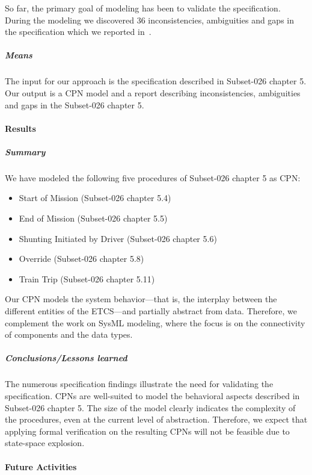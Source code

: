 So far, the primary goal of modeling has been to validate the specification. During the modeling we discovered 36 inconsistencies, ambiguities and gaps in the specification which we reported in~\cite{specfindings}. 


\subparagraph{Means}

The input for our approach is the specification described in Subset-026 chapter 5. Our output is a CPN model and a report describing inconsistencies, ambiguities and gaps in the Subset-026 chapter 5.


\paragraph{Results}

\subparagraph{Summary}

We have modeled the following five procedures of Subset-026 chapter 5 as CPN:
\begin{itemize}
	\item Start of Mission (Subset-026 chapter 5.4)
	\item End of Mission (Subset-026 chapter 5.5)
	\item Shunting Initiated by Driver (Subset-026 chapter 5.6)
	\item Override (Subset-026 chapter 5.8)
	\item Train Trip (Subset-026 chapter 5.11)
\end{itemize}

Our CPN models the system behavior---that is, the interplay between the different entities of the ETCS---and partially abstract from data. Therefore, we complement the work on SysML modeling, where the focus is on the connectivity of components and the data types.
 
\subparagraph{Conclusions/Lessons learned}
 
The numerous specification findings illustrate the need for validating the specification. CPNs are well-suited to model the behavioral aspects described in Subset-026 chapter 5. The size of the model clearly indicates the complexity of the procedures, even at the current level of abstraction. Therefore, we expect that applying formal verification on the resulting CPNs will not be feasible due to state-space explosion.

\paragraph{Future Activities}


